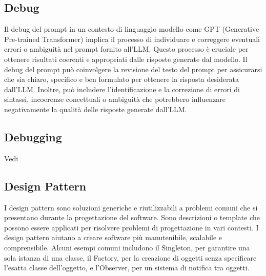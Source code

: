 \vspace{2em}
\subsection*{Debug}
\par Il debug del prompt in un contesto di linguaggio modello come GPT (Generative Pre-trained Transformer) implica il processo di individuare e correggere eventuali errori o ambiguità nel prompt fornito all'LLM. Questo processo è cruciale per ottenere risultati coerenti e appropriati dalle risposte generate dal modello. Il debug del prompt può coinvolgere la revisione del testo del prompt per assicurarsi che sia chiaro, specifico e ben formulato per ottenere la risposta desiderata dall'LLM. Inoltre, può includere l'identificazione e la correzione di errori di sintassi, incoerenze concettuali o ambiguità che potrebbero influenzare negativamente la qualità delle risposte generate dall'LLM.


\vspace{2em}
\subsection*{Debugging}
\par Vedi 

\vspace{2em}
\subsection*{Design Pattern}
\par I design pattern sono soluzioni generiche e riutilizzabili a problemi comuni che si presentano durante la progettazione del software. Sono descrizioni o template che possono essere applicati per risolvere problemi di progettazione in vari contesti. I design pattern aiutano a creare software più manutenibile, scalabile e comprensibile. Alcuni esempi comuni includono il Singleton, per garantire una sola istanza di una classe, il Factory, per la creazione di oggetti senza specificare l'esatta classe dell'oggetto, e l'Observer, per un sistema di notifica tra oggetti.

